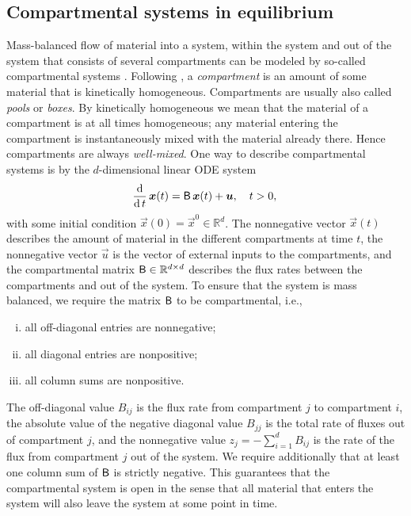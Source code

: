 \documentclass[smallextended]{svjour3}
\newcommand{\R}{\mathbb{R}}
\newcommand{\deriv}[1]{\frac{\operatorname{d}}{\operatorname{d}#1}}
\newcommand{\ie}{i.e.}
\begin{document}
\subsection{Compartmental systems in equilibrium}\label{sec:one_particle}
Mass-balanced flow of material into a system, within the system and out of the system that consists of several compartments can be modeled by so-called compartmental systems \citep{Anderson1983}.
Following \citet{Jacquez1993SIAM}, a \emph{compartment} is an amount of some material that is kinetically homogeneous.
Compartments are usually also called \emph{pools} or \emph{boxes}.
By kinetically homogeneous we mean that the material of a compartment is at all times homogeneous; any material entering the compartment is instantaneously mixed with the material already there.
Hence compartments are always \emph{well-mixed}.
One way to describe compartmental systems is by the $d$-dimensional linear ODE system
\begin{equation}\label{eqn:lin_CS_sys}
  \deriv{t}\,\vec{x}(t) = \tens{B}\,\vec{x}(t) + \vec{u},\quad t>0,\\
\end{equation}
with some initial condition $\vec{x}(0) = \vec{x}^0\in\R^d$.
The nonnegative vector $\vec{x}(t)$ describes the amount of material in the different compartments at time $t$, the nonnegative vector $\vec{u}$ is the vector of external inputs to the compartments, and the compartmental matrix $\tens{B}\in\R^{d\times d}$ describes the flux rates between the compartments and out of the system.
To ensure that the system is mass balanced, we require the matrix $\mathsf{B}$ to be compartmental, \ie, 
\begin{enumerate}[(i)]
    \item all off-diagonal entries are nonnegative;
    \item all diagonal entries are nonpositive;
    \item all column sums are nonpositive.
\end{enumerate}
The off-diagonal value $B_{ij}$ is the flux rate from compartment $j$ to compartment $i$, the absolute value of the negative diagonal value $B_{jj}$ is the total rate of fluxes out of compartment $j$, and the nonnegative value $z_j=-\sum_{i=1}^d B_{ij}$ is the rate of the flux from compartment $j$ out of the system.
We require additionally that at least one column sum of $\mathsf{B}$ is strictly negative.
This guarantees that the compartmental system is open in the sense that all material that enters the system will also leave the system at some point in time.
\end{document}
